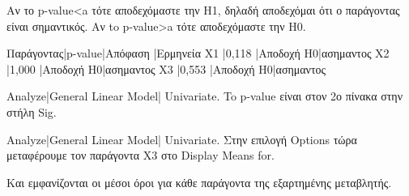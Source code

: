 \documentclass{assignment}
\begin{document}
\begin{Assignment}[Μέρος Δ]
Αν το p-value<a τότε αποδεχόμαστε την Η1, δηλαδή αποδεχόμαι ότι ο παράγοντας είναι σημαντικός.
Αν to p-value>a τότε αποδεχόμαστε την Η0.

Παράγοντας|p-value|Απόφαση   |Ερμηνεία
Χ1        |0,118  |Αποδοχή Η0|ασημαντος
Χ2        |1,000  |Αποδοχή Η0|ασημαντος
Χ3        |0,553  |Αποδοχή Η0|ασημαντος

Analyze|General Linear Model| Univariate. To p-value είναι στον 2ο πίνακα στην στήλη Sig.









Analyze|General Linear Model| Univariate. Στην επιλογή Options τώρα μεταφέρουμε τον παράγοντα Χ3 στο Display Means for.

Και εμφανίζονται οι μέσοι όροι για κάθε παράγοντα της εξαρτημένης μεταβλητής.








\end{Assignment}

\clearpage
\end{document}
